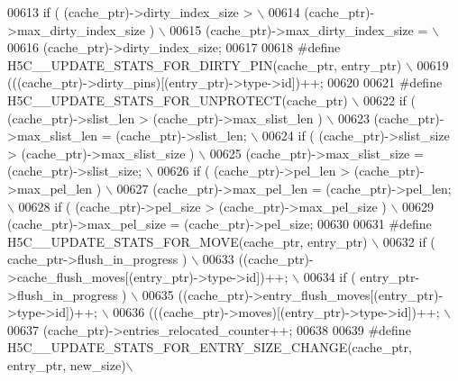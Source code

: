 \begin{DoxyCode}
00613 \textcolor{preprocessor}{        if ( (cache\_ptr)->dirty\_index\_size >                               \(\backslash\)}
00614 \textcolor{preprocessor}{                (cache\_ptr)->max\_dirty\_index\_size )                        \(\backslash\)}
00615 \textcolor{preprocessor}{            (cache\_ptr)->max\_dirty\_index\_size =                            \(\backslash\)}
00616 \textcolor{preprocessor}{                (cache\_ptr)->dirty\_index\_size;}
00617 
00618 \textcolor{preprocessor}{#define H5C\_\_UPDATE\_STATS\_FOR\_DIRTY\_PIN(cache\_ptr, entry\_ptr) \(\backslash\)}
00619 \textcolor{preprocessor}{    (((cache\_ptr)->dirty\_pins)[(entry\_ptr)->type->id])++;}
00620 
00621 \textcolor{preprocessor}{#define H5C\_\_UPDATE\_STATS\_FOR\_UNPROTECT(cache\_ptr)                   \(\backslash\)}
00622 \textcolor{preprocessor}{        if ( (cache\_ptr)->slist\_len > (cache\_ptr)->max\_slist\_len )   \(\backslash\)}
00623 \textcolor{preprocessor}{        (cache\_ptr)->max\_slist\_len = (cache\_ptr)->slist\_len;     \(\backslash\)}
00624 \textcolor{preprocessor}{        if ( (cache\_ptr)->slist\_size > (cache\_ptr)->max\_slist\_size ) \(\backslash\)}
00625 \textcolor{preprocessor}{        (cache\_ptr)->max\_slist\_size = (cache\_ptr)->slist\_size;   \(\backslash\)}
00626 \textcolor{preprocessor}{    if ( (cache\_ptr)->pel\_len > (cache\_ptr)->max\_pel\_len )       \(\backslash\)}
00627 \textcolor{preprocessor}{        (cache\_ptr)->max\_pel\_len = (cache\_ptr)->pel\_len;         \(\backslash\)}
00628 \textcolor{preprocessor}{    if ( (cache\_ptr)->pel\_size > (cache\_ptr)->max\_pel\_size )     \(\backslash\)}
00629 \textcolor{preprocessor}{        (cache\_ptr)->max\_pel\_size = (cache\_ptr)->pel\_size;}
00630 
00631 \textcolor{preprocessor}{#define H5C\_\_UPDATE\_STATS\_FOR\_MOVE(cache\_ptr, entry\_ptr)               \(\backslash\)}
00632 \textcolor{preprocessor}{    if ( cache\_ptr->flush\_in\_progress )                            \(\backslash\)}
00633 \textcolor{preprocessor}{            ((cache\_ptr)->cache\_flush\_moves[(entry\_ptr)->type->id])++; \(\backslash\)}
00634 \textcolor{preprocessor}{        if ( entry\_ptr->flush\_in\_progress )                            \(\backslash\)}
00635 \textcolor{preprocessor}{            ((cache\_ptr)->entry\_flush\_moves[(entry\_ptr)->type->id])++; \(\backslash\)}
00636 \textcolor{preprocessor}{    (((cache\_ptr)->moves)[(entry\_ptr)->type->id])++;               \(\backslash\)}
00637 \textcolor{preprocessor}{        (cache\_ptr)->entries\_relocated\_counter++;}
00638 
00639 \textcolor{preprocessor}{#define H5C\_\_UPDATE\_STATS\_FOR\_ENTRY\_SIZE\_CHANGE(cache\_ptr, entry\_ptr, new\_size)\(\backslash\)}

\end{DoxyCode}
